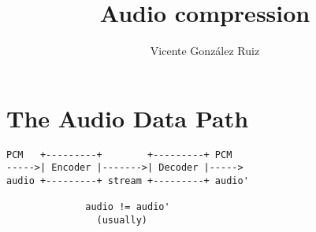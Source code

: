 \title{Audio compression}
\author{Vicente González Ruiz}
\maketitle
\tableofcontents

\section{The Audio Data Path~\cite{sayood2017introduction}}

\begin{verbatim}
PCM   +---------+        +---------+ PCM
----->| Encoder |------->| Decoder |----->
audio +---------+ stream +---------+ audio'

              audio != audio'
                (usually)
\end{verbatim}

\section{}
\section{}
\section{}



